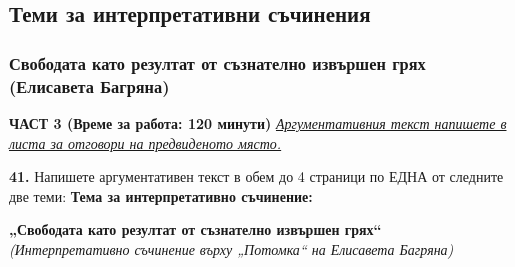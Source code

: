 \documentclass[12pt,a4paper]{article}
\begin{document}
\newpage

\subsection{Теми за интерпретативни съчинения}
\subsubsection{Свободата като резултат от съзнателно извършен грях (Елисавета Багряна)}
\vspace{0.5cm}
\begin{center}
\textbf{ЧАСТ 3 (Време за работа: 120 минути)}
\vspace{0.2cm}
{\textit{\underline{Аргументативния текст напишете в листа за отговори на предвиденото място.}}}
\vspace{0.1cm}
\end{center}
\textbf{41.} Напишете аргументативен текст в обем до 4 страници по ЕДНА от следните две теми:
\vspace{0.2cm}
\textbf{Тема за интерпретативно съчинение:}
\vspace{0.1cm}
\begin{center}
\textbf{„Свободата като резултат от съзнателно извършен грях“}
\\
\textit{(Интерпретативно съчинение върху „Потомка“ на Елисавета Багряна)}
\end{center}
\end{document}
